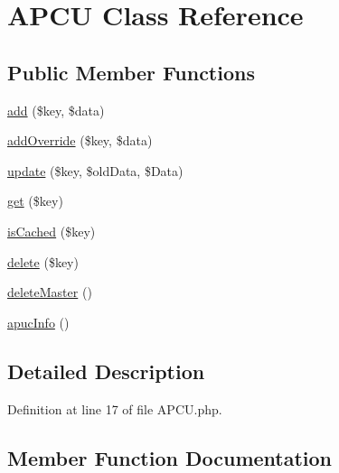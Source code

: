 \hypertarget{class_zest_1_1_cache_1_1_a_p_c_u_1_1_a_p_c_u}{}\section{A\+P\+CU Class Reference}
\label{class_zest_1_1_cache_1_1_a_p_c_u_1_1_a_p_c_u}
\subsection*{Public Member Functions}
\begin{DoxyCompactItemize}
\item 
\mbox{\hyperlink{class_zest_1_1_cache_1_1_a_p_c_u_1_1_a_p_c_u_a833427e5e43e2bfa19b4c31e9a7944ca}{add}} (\$key, \$data)
\item 
\mbox{\hyperlink{class_zest_1_1_cache_1_1_a_p_c_u_1_1_a_p_c_u_a943b461129dabcd32e99b0516c9c9bc6}{add\+Override}} (\$key, \$data)
\item 
\mbox{\hyperlink{class_zest_1_1_cache_1_1_a_p_c_u_1_1_a_p_c_u_a8c978ff3d82895f2888bd5a3c6b444c9}{update}} (\$key, \$old\+Data, \$Data)
\item 
\mbox{\hyperlink{class_zest_1_1_cache_1_1_a_p_c_u_1_1_a_p_c_u_a24a9bf83a1002d46ece83a93d14bd921}{get}} (\$key)
\item 
\mbox{\hyperlink{class_zest_1_1_cache_1_1_a_p_c_u_1_1_a_p_c_u_a83d5aac122d402321a64efa1695cccd4}{is\+Cached}} (\$key)
\item 
\mbox{\hyperlink{class_zest_1_1_cache_1_1_a_p_c_u_1_1_a_p_c_u_aa74a2edd6f3cbb5c5353f7faa97b6d70}{delete}} (\$key)
\item 
\mbox{\hyperlink{class_zest_1_1_cache_1_1_a_p_c_u_1_1_a_p_c_u_a8c506f34ffddafc896eb96958b813d58}{delete\+Master}} ()
\item 
\mbox{\hyperlink{class_zest_1_1_cache_1_1_a_p_c_u_1_1_a_p_c_u_a60ad85517f8c59f4fa351ecbfde3a3f5}{apuc\+Info}} ()
\end{DoxyCompactItemize}


\subsection{Detailed Description}


Definition at line 17 of file A\+P\+C\+U.\+php.



\subsection{Member Function Documentation}
\mbox{\label{class_zest_1_1_cache_1_1_a_p_c_u_1_1_a_p_c_u_a833427e5e43e2bfa19b4c31e9a7944ca}} 
